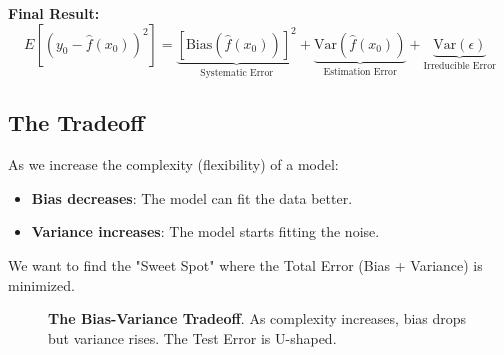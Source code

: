 \documentclass[11pt, a4paper]{article}
\begin{document}
\textbf{Final Result:}
\begin{equation}
    E[(y_0 - \hat{f}(x_0))^2] = \underbrace{[\text{Bias}(\hat{f}(x_0))]^2}_{\text{Systematic Error}} + \underbrace{\text{Var}(\hat{f}(x_0))}_{\text{Estimation Error}} + \underbrace{\text{Var}(\epsilon)}_{\text{Irreducible Error}}
\end{equation}

\subsection{The Tradeoff}
As we increase the complexity (flexibility) of a model:
\begin{itemize}
    \item \textbf{Bias decreases}: The model can fit the data better.
    \item \textbf{Variance increases}: The model starts fitting the noise.
\end{itemize}

We want to find the "Sweet Spot" where the Total Error (Bias + Variance) is minimized.

\begin{figure}[h]
    \centering
    \caption{\textbf{The Bias-Variance Tradeoff}. As complexity increases, bias drops but variance rises. The Test Error is U-shaped.}
\end{figure}
\end{document}
